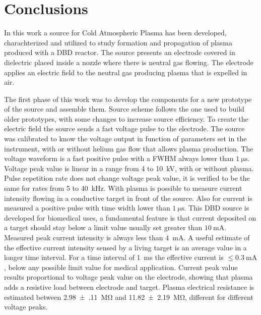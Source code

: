 \chapter{Conclusions}
\label{ch:conclusions}
In this work a source for Cold Atmospheric Plasma has been developed, charachterized and utilized to study formation and propagation of plasma produced with a DBD reactor.
The source presents an electrode covered in dielectric placed inside a nozzle where there is neutral gas flowing. The electrode applies an electric field to the neutral gas producing plasma that is expelled in air.

The first phase of this work was to develop the components for a new prototype of the source and assemble them. Source scheme follows the one used to build older prototypes, with some changes to increase source efficiency.
To create the electric field the source sends a fast voltage pulse to the electrode. The source was calibrated to know the voltage output in function of parameters set in the instrument, with or without helium gas flow that allows plasma production.
The voltage waveform is a fast positive pulse with a FWHM always lower than $\SI{1}{\micro\second}$. Voltage peak value is linear in a range from \num{4} to \SI{10}{\kilo\volt}, with or without plasma. Pulse repetition rate does not change voltage peak value, it is verified to be the same for rates from \num{5} to \SI{40}{\kilo\hertz}.
With plasma is possible to measure current intensity flowing in a conductive target in front of the source. Also for current is measured a positive pulse with time width lower than $\SI{1}{\micro\second}$. This DBD source is developed for biomedical uses, a fundamental feature is that current deposited on a target should stay below a limit value usually set greater than $\SI{10}{\milli\ampere}$. Measured peak current intensity is always less than \SI{4}{\milli\ampere}. %
 A useful estimate of the effective current intensity sensed by a living target is an average value in a longer time interval. For a time interval of \SI{1}{\milli\second} the effective current is $\le \SI{0.3}{\milli\ampere}$, below any possible limit value for medical application.
Current peak value results proportional to voltage peak value on the electrode, showing that plasma adds a resistive load between electrode and target. Plasma electrical resistance is estimated between \SI{2.98(11)}{\mega\ohm} and \SI{11.82(219)}{\mega\ohm}, different for different voltage peaks.
